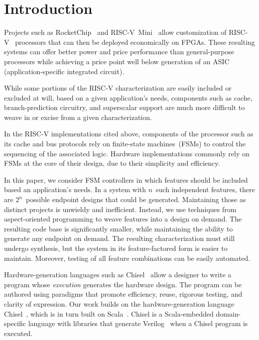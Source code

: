 \documentclass[conference]{IEEEtran}
\begin{document}
\maketitle

\section{Introduction}

Projects such as RocketChip~\cite{chisel:riscv} and RISC-V~Mini~\cite{Kim:22} allow customization of RISC-V~\cite{riscvwebsite} processors that can then be deployed economically on FPGAs.  These resulting systems can offer better power and price performance than general-purpose processors while achieving a price point well below generation of an ASIC (application-specific integrated circuit).

While some portions of the RISC-V characterization are easily included or excluded at will, based on a given application's needs, components such as cache, branch-prediction circuitry, and superscalar support are much more difficult to weave in or excise from a given characterization.

In the RISC-V implementations cited above, components of the processor such as its cache and bus protocols rely on finite-state machines~(FSMs) to control the sequencing of the associated logic.   Hardware implementations commonly rely on FSMs at the core of their design, due to their simplicity and efficiency.

In this paper, we consider FSM controllers in which  features should be included based an application's needs.  In a system with $n$~such independent features, there are $2^n$~possible endpoint designs that could be generated.  Maintaining those as distinct projects is unwieldy and inefficient.  Instead, we use techniques from aspect-oriented programming to weave features into a design on demand.  The resulting code base is significantly smaller, while maintaining the ability to generate any endpoint on demand.   The resulting characterization must still undergo synthesis, but the system in its feature-factored form is easier to maintain.  Moreover, testing of all feature combinations can be easily automated.

Hardware-generation languages such as Chisel~\cite{chisel:article} allow a designer to write a program whose \emph{execution} generates the hardware design. The program can be authored using para\-digms that promote efficiency, reuse, rigorous testing, and clarity of expression. Our work builds on the hardware-generation language Chisel~\cite{chisel:book}, which is in turn built on Scala~\cite{scala-overview-tech-report}. Chisel is a Scala-embedded domain-specific language with libraries that generate Verilog~\cite{verilog} when a Chisel program is executed.
\end{document}
